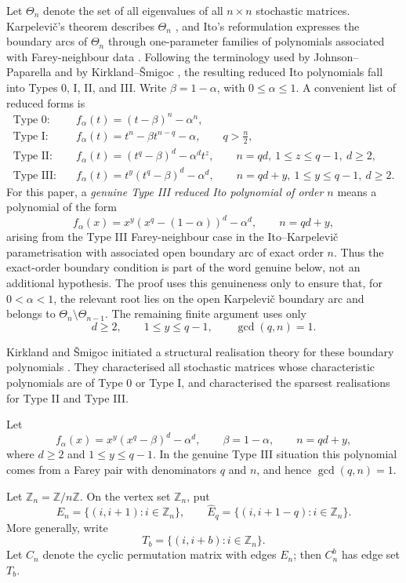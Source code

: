 \documentclass[11pt]{article}
\numberwithin{equation}{section}
\newcommand{\Zn}{\mathbb Z_n}
\newcommand{\Ehat}{\widehat E_q}
\begin{document}
Let $\Theta_n$ denote the set of all eigenvalues of all $n\times n$ stochastic
matrices. Karpelevi\v{c}'s theorem describes $\Theta_n$ \cite{Karpelevic},
and Ito's reformulation expresses the boundary arcs of $\Theta_n$ through
one-parameter families of polynomials associated with Farey-neighbour data
\cite{Ito}. Following the terminology used by Johnson--Paparella
\cite{JohnsonPaparella} and by Kirkland--\v{S}migoc \cite{KirklandSmigoc},
the resulting reduced Ito polynomials fall into Types 0, I, II, and III.
Write $\beta=1-\alpha$, with $0\le\alpha\le1$. A convenient list of reduced
forms is
\[
\begin{aligned}
\text{Type 0:}\quad
&f_\alpha(t)=(t-\beta)^n-\alpha^n,\\
\text{Type I:}\quad
&f_\alpha(t)=t^n-\beta t^{n-q}-\alpha,
\qquad q>\frac n2,\\
\text{Type II:}\quad
&f_\alpha(t)=(t^q-\beta)^d-\alpha^dt^z,
\qquad n=qd,\ 1\le z\le q-1,\ d\ge2,\\
\text{Type III:}\quad
&f_\alpha(t)=t^y(t^q-\beta)^d-\alpha^d,
\qquad n=qd+y,\ 1\le y\le q-1,\ d\ge2.
\end{aligned}
\]
For this paper, a \emph{genuine Type III reduced Ito polynomial of order
$n$} means a polynomial of the form
\[
        f_\alpha(x)=x^y(x^q-(1-\alpha))^d-\alpha^d,
        \qquad n=qd+y,
\]
arising from the Type III Farey-neighbour case in the Ito--Karpelevi\v{c}
parametrisation with associated open boundary arc of exact order $n$. Thus
the exact-order boundary condition is part of the word genuine below, not an
additional hypothesis. The proof uses this genuineness only to ensure that,
for $0<\alpha<1$, the relevant root lies on the open Karpelevi\v{c} boundary
arc and belongs to $\Theta_n\setminus\Theta_{n-1}$. The remaining finite
argument uses only
\[
        d\ge2,\qquad 1\le y\le q-1,\qquad \gcd(q,n)=1.
\]

Kirkland and \v{S}migoc initiated a structural realisation theory for these
boundary polynomials \cite{KirklandSmigoc}. They characterised all stochastic
matrices whose characteristic polynomials are of Type 0 or Type I, and
characterised the sparsest realisations for Type II and Type III.

Let
\[
        f_\alpha(x)=x^y(x^q-\beta)^d-\alpha^d,
        \qquad \beta=1-\alpha,
        \qquad n=qd+y,
\]
where $d\ge2$ and $1\le y\le q-1$. In the genuine Type III situation this
polynomial comes from a Farey pair with denominators $q$ and $n$, and hence
$\gcd(q,n)=1$.

Let $\Zn=\mathbb Z/n\mathbb Z$. On the vertex set $\Zn$, put
\[
        E_n=\{(i,i+1):i\in\Zn\},
        \qquad
        \Ehat=\{(i,i+1-q):i\in\Zn\}.
\]
More generally, write
\[
        T_b=\{(i,i+b):i\in\Zn\}.
\]
Let $C_n$ denote the cyclic permutation matrix with edges $E_n$; then
$C_n^b$ has edge set $T_b$.
\end{document}
